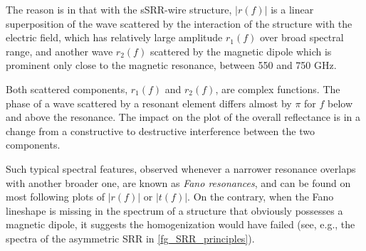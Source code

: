 The reason is in that with the sSRR-wire structure, $|r(f)|$ is a linear superposition of the wave scattered by the interaction of the structure with the electric field, which has relatively large amplitude $r_{1}(f)$ over broad spectral range, and another wave $r_{2}(f)$ scattered by the magnetic dipole which is prominent only close to the magnetic resonance, between 550 and 750 GHz.

Both scattered components, $r_1(f)$ and $r_2(f)$, are complex functions. The phase of a wave scattered by a resonant element differs almost by $\pi$ for $f$ below and above the resonance. The impact on the plot of the overall reflectance is in a change from a constructive to destructive interference between the two components. 

Such typical spectral features, observed whenever a narrower resonance overlaps with another broader one, are known as \textit{Fano resonances}, and can be found on most following plots of $|r(f)|$ or $|t(f)|$. On the contrary, when the Fano lineshape is missing in the spectrum of a structure that obviously possesses a magnetic dipole, it suggests the homogenization would have failed (see, e.g., the spectra of the asymmetric SRR in \ref{fg_SRR_principles}).  

